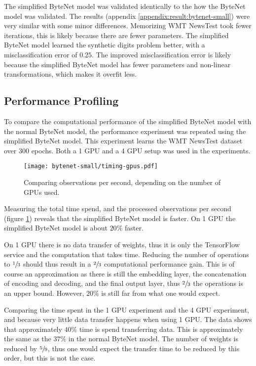 The simplified ByteNet model was validated identically to the how the ByteNet model was validated. The results (appendix \ref{appendix:result:bytenet-small}) were very similar with some minor differences. Memorizing WMT NewsTest took fewer iterations, this is likely because there are fewer parameters. The simplified ByteNet model learned the synthetic digits problem better, with a misclassification error of $0.25$. The improved misclassification error is likely because the simplified ByteNet model has fewer parameters and non-linear transformations, which makes it overfit less.

\subsection{Performance Profiling}

To compare the computational performance of the simplified ByteNet model with the normal ByteNet model, the performance experiment was repeated using the simplified ByteNet model. This experiment learns the WMT NewsTest dataset over 300 epochs. Both a 1 GPU and a 4 GPU setup was used in the experiments.

\begin{figure}[h]
    \centering
    \texttt{[image: bytenet-small/timing-gpus.pdf]}
    \caption{Comparing observations per second, depending on the number of GPUs used.}
    \label{fig:result:simple-bytenet:timing-gpus}
\end{figure}

Measuring the total time spend, and the processed observations per second (figure \ref{fig:result:simple-bytenet:timing-gpus}) reveals that the simplified ByteNet model is faster. On 1 GPU the simplified ByteNet model is about $20\%$ faster.

On 1 GPU there is no data transfer of weights, thus it is only the TensorFlow service and the computation that takes time. Reducing the number of operations to $\sfrac{1}{3}$ should thus result in a $\sfrac{2}{3}$ computational performance gain. This is of course an approximation as there is still the embedding layer, the concatenation of encoding and decoding, and the final output layer, thus $\sfrac{2}{3}$ the operations is an upper bound. However, $20\%$ is still far from what one would expect.

Comparing the time spent in the 1 GPU experiment and the 4 GPU experiment, and because very little data transfer happens when using 1 GPU. The data shows that approximately $40\%$ time is spend transferring data. This is approximately the same as the $37\%$ in the normal ByteNet model. The number of weights is reduced by $\sfrac{5}{9}$, thus one would expect the transfer time to be reduced by this order, but this is not the case.

